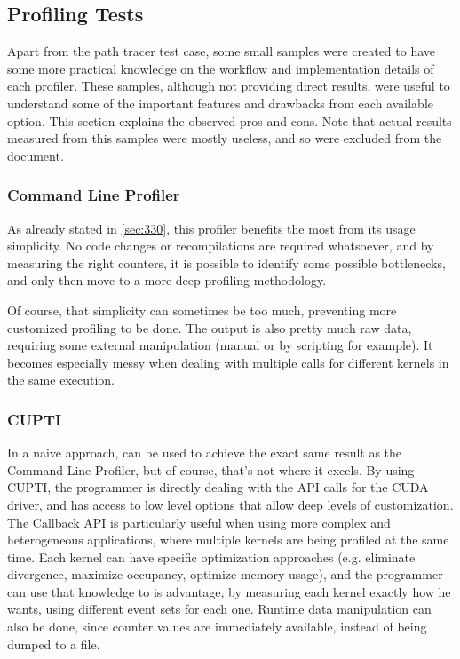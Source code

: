 \subsection{Profiling Tests}
\label{sec:520}

Apart from the path tracer test case, some small samples were created to have some more practical knowledge on the workflow and implementation details of each profiler. These samples, although not providing direct results, were useful to understand some of the important features and drawbacks from each available option. This section explains the observed pros and cons. Note that actual results measured from this samples were mostly useless, and so were excluded from the document.

\subsubsection{Command Line Profiler}
\label{sec:521}

As already stated in \cref{sec:330}, this profiler benefits the most from its usage simplicity. No code changes or recompilations are required whatsoever, and by measuring the right counters, it is possible to identify some possible bottlenecks, and only then move to a more deep profiling methodology.

Of course, that simplicity can sometimes be too much, preventing more customized profiling to be done. The output is also pretty much raw data, requiring some external manipulation (manual or by scripting for example). It becomes especially messy when dealing with multiple calls for different kernels in the same execution.

\subsubsection{CUPTI}
\label{sec:522}

In a naive approach, can be used to achieve the exact same result as the Command Line Profiler, but of course, that's not where it excels. By using CUPTI, the programmer is directly dealing with the API calls for the CUDA driver, and has access to low level options that allow deep levels of customization. The Callback API is particularly useful when using more complex and heterogeneous applications, where multiple kernels are being profiled at the same time. Each kernel can have specific optimization approaches (e.g. eliminate divergence, maximize occupancy, optimize memory usage), and the programmer can use that knowledge to is advantage, by measuring each kernel exactly how he wants, using different event sets for each one.
Runtime data manipulation can also be done, since counter values are immediately available, instead of being dumped to a file.

